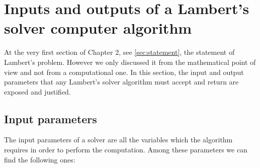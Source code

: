 \section{Inputs and outputs of a Lambert's solver computer algorithm}

At the very first section of Chapter 2, see \ref{sec:statement}, the statement
of Lambert's problem. However we only discussed it from the mathematical point
of view and not from a computational one. In this section, the input and output
parameters that any Lambert's solver algorithm must accept and return are
exposed and justified.

\subsection{Input parameters}

The input parameters of a solver are all the variables which the algorithm
requires in order to perform the computation. Among these parameters we can find
the following ones:

